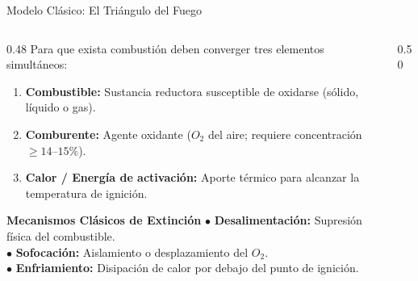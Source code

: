 \begin{frame}{Modelo Clásico: El Triángulo del Fuego}
  \begin{columns}[c]
    \begin{column}{0.48\textwidth}
      \small
      Para que exista combustión deben converger tres elementos simultáneos:
      \begin{enumerate}
        \scriptsize
        \item \textbf{Combustible:} Sustancia reductora susceptible de oxidarse (sólido, líquido o gas).
        \item \textbf{Comburente:} Agente oxidante ($O_2$ del aire; requiere concentración $\ge 14\text{--}15\%$).
        \item \textbf{Calor / Energía de activación:} Aporte térmico para alcanzar la temperatura de ignición.
      \end{enumerate}
      \vspace{0.15cm}
      \begin{alertblock}{\textbf{Mecanismos Clásicos de Extinción}}
        \scriptsize
        $\bullet$ \textbf{Desalimentación:} Supresión física del combustible.\\
        $\bullet$ \textbf{Sofocación:} Aislamiento o desplazamiento del $O_2$.\\
        $\bullet$ \textbf{Enfriamiento:} Disipación de calor por debajo del punto de ignición.
      \end{alertblock}
    \end{column}

    \begin{column}{0.50\textwidth}
      \centering
\end{column}
\end{columns}
\end{frame}
